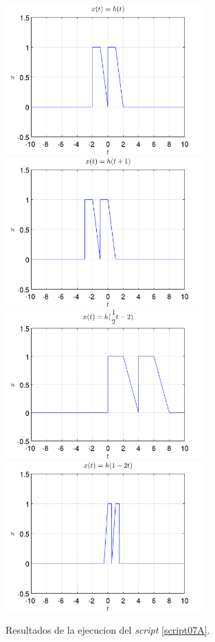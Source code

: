 \documentclass[a4paper,12pt,final]{article}
\begin{document}
      \newpage
      \begin{figure}[H]
        \caption{Resultados de la ejecucion del \emph{script} \ref{script07A}.}
        \label{script07figure1}
        \vspace{0.7em}
        \vspace{0.1em}
        \includegraphics[width=3in]{./laboratorio_2/problema07.png}
        \includegraphics[width=3in]{./laboratorio_2/problema07_a.png}
        \vspace{0.7em}
        \vspace{0.1em}
        \includegraphics[width=3in]{./laboratorio_2/problema07_b.png}
        \includegraphics[width=3in]{./laboratorio_2/problema07_c.png}

\end{figure}
\end{document}
